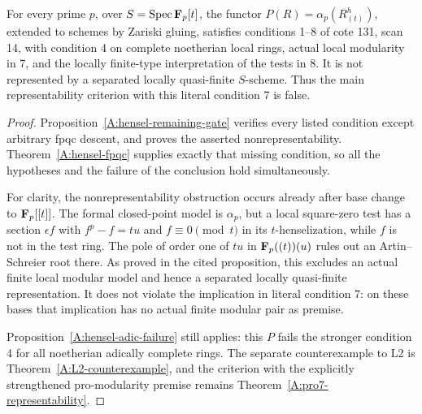 \begin{theorem}
\label{A:main-counterexample}
For every prime $p$, over $S=\operatorname{Spec}\mathbf F_p[t]$, the functor
$P(R)=\alpha_p(R^h_{(t)})$, extended to schemes by Zariski gluing,
satisfies conditions 1--8 of cote 131, scan 14, with condition 4
on complete noetherian local rings, actual local modularity in 7,
and the locally finite-type interpretation of the tests in 8.
It is not represented by a separated locally quasi-finite
$S$-scheme.  Thus the main representability criterion with this
literal condition 7 is false.
\end{theorem}
\begin{proof}
Proposition~\ref{A:hensel-remaining-gate} verifies every listed
condition except arbitrary fpqc descent, and proves the asserted
nonrepresentability.  Theorem~\ref{A:hensel-fpqc} supplies exactly
that missing condition, so all the hypotheses and the failure of
the conclusion hold simultaneously.

For clarity, the nonrepresentability obstruction occurs already
after base change to $\mathbf F_p[[t]]$.  The formal closed-point model
is $\alpha_p$, but a local square-zero test has a section
$\epsilon f$ with $f^p-f=tu$ and $f\equiv0\pmod t$ in its
$t$-henselization, while $f$ is not in the test ring.  The pole
of order one of $tu$ in $\mathbf F_p((t))(u)$ rules out an
Artin--Schreier root there.  As proved in the cited proposition,
this excludes an actual finite local modular model and hence a
separated locally quasi-finite representation.  It does not
violate the implication in literal condition 7: on these bases
that implication has no actual finite modular pair as premise.

Proposition~\ref{A:hensel-adic-failure} still applies: this $P$
fails the stronger condition 4 for all noetherian adically complete
rings.  The separate counterexample to L2 is
Theorem~\ref{A:L2-counterexample}, and the criterion with the
explicitly strengthened pro-modularity premise remains
Theorem~\ref{A:pro7-representability}.
\end{proof}
